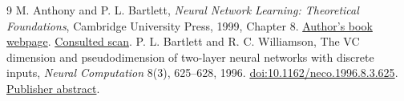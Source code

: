 \documentclass[11pt]{article}
\begin{document}
\begin{thebibliography}{9}
M. Anthony and P. L. Bartlett,
\emph{Neural Network Learning: Theoretical Foundations},
Cambridge University Press, 1999, Chapter 8.
\href{https://www.stat.berkeley.edu/~bartlett/nnl/index.html}{Author's book webpage}.
\href{https://openeclass.panteion.gr/modules/document/file.php/PMS152/LEARNING/Anthony\%20Martin\%2C\%20Bartlett\%20Peter\%20L.\%20\%282009\%29\%20--\%20Neural\%20Network\%20Learning_\%20Theoretical\%20Foundations.pdf}{Consulted scan}.
P. L. Bartlett and R. C. Williamson,
The VC dimension and pseudodimension of two-layer neural networks
with discrete inputs, \emph{Neural Computation} 8(3), 625--628, 1996.
\href{https://doi.org/10.1162/neco.1996.8.3.625}{doi:10.1162/neco.1996.8.3.625}.
\href{https://ieeexplore.ieee.org/document/6796931/}{Publisher abstract}.
\end{thebibliography}
\end{document}
